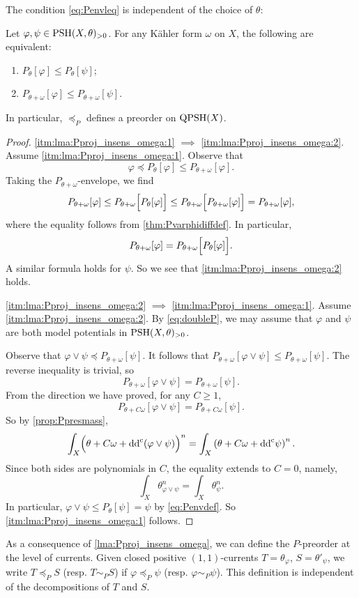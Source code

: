 The condition \eqref{eq:Penvleq} is independent of the choice of $\theta$:
\begin{lemma}\label{lma:Pproj_insens_omega}
    Let $\varphi,\psi\in \mathrm{PSH}(X,\theta)_{>0}$. For any Kähler form $\omega$ on $X$, the following are equivalent:
    \begin{enumerate}
        \item\label{itm:lma:Pproj_insens_omega:1} $P_{\theta}[\varphi]\leq P_{\theta}[\psi]$;
        \item\label{itm:lma:Pproj_insens_omega:2} $P_{\theta+\omega}[\varphi]\leq P_{\theta+\omega}[\psi]$.
    \end{enumerate}
\end{lemma}
In particular, $\preceq_P$ defines a preorder on $\mathrm{QPSH}(X)$.
\begin{proof}
    \ref{itm:lma:Pproj_insens_omega:1} $\implies$ \ref{itm:lma:Pproj_insens_omega:2}. Assume \ref{itm:lma:Pproj_insens_omega:1}. Observe that
    \[
    \varphi\preceq P_{\theta}[\varphi]\leq P_{\theta+\omega}[\varphi].
    \]
    Taking the $P_{\theta+\omega}$-envelope, we find
    \[
    P_{\theta+\omega}[\varphi] \leq P_{\theta+\omega}\Bigl[P_{\theta}[\varphi]\Bigr] \leq P_{\theta+\omega}\Bigl[P_{\theta+\omega}[\varphi]\Bigr]=P_{\theta+\omega}[\varphi],
    \]
    where the equality follows from \cref{thm:Pvarphidiffdef}. In particular,
    \begin{equation}\label{eq:doubleP}
    P_{\theta+\omega}[\varphi]=P_{\theta+\omega}\Bigl[P_{\theta}[\varphi]\Bigr].
    \end{equation}
    A similar formula holds for $\psi$. So we see that \ref{itm:lma:Pproj_insens_omega:2} holds.

    \ref{itm:lma:Pproj_insens_omega:2} $\implies$ \ref{itm:lma:Pproj_insens_omega:1}. Assume \ref{itm:lma:Pproj_insens_omega:2}. By \eqref{eq:doubleP}, we may assume that $\varphi$ and $\psi$ are both model potentials in $\mathrm{PSH}(X,\theta)_{>0}$.

    Observe that $\varphi\lor \psi\preceq P_{\theta+\omega}[\psi]$.
    It follows that $P_{\theta+\omega}[\varphi\lor \psi]\leq P_{\theta+\omega}[\psi]$.
    The reverse inequality is trivial, so
    \[
    P_{\theta+\omega}[\varphi\lor \psi]= P_{\theta+\omega}[\psi].
    \]
    From the direction we have proved, for any $C\geq 1$,
    \[
    P_{\theta+C\omega}[\varphi\lor \psi]= P_{\theta+C\omega}[\psi].
    \]
    So by \cref{prop:Ppresmass},
    \[
    \int_X \Bigl(\theta+C\omega+\mathrm{dd}^{\mathrm{c}}(\varphi\lor \psi)\Bigr)^n=\int_X\left(\theta+C\omega+\mathrm{dd}^{\mathrm{c}}\psi\right)^n.
    \]
    Since both sides are polynomials in $C$, the equality extends to $C=0$, namely,
    \[
    \int_X \theta_{\varphi\lor \psi}^n=\int_X \theta_{\psi}^n.
    \]
    In particular, $\varphi\lor \psi\leq P_{\theta}[\psi]=\psi$ by \eqref{eq:Penvdef}. So \ref{itm:lma:Pproj_insens_omega:1} follows.
\end{proof}
As a consequence of \cref{lma:Pproj_insens_omega}, we can define the $P$-preorder at the level of currents.
Given closed positive $(1,1)$-currents $T=\theta_{\varphi}$, $S=\theta'_{\psi}$, we write $T\preceq_P S$ (resp. $T\sim_P S$) if $\varphi\preceq_P \psi$ (resp. $\varphi\sim_P \psi$). This definition is independent of the decompositions of $T$ and $S$.

